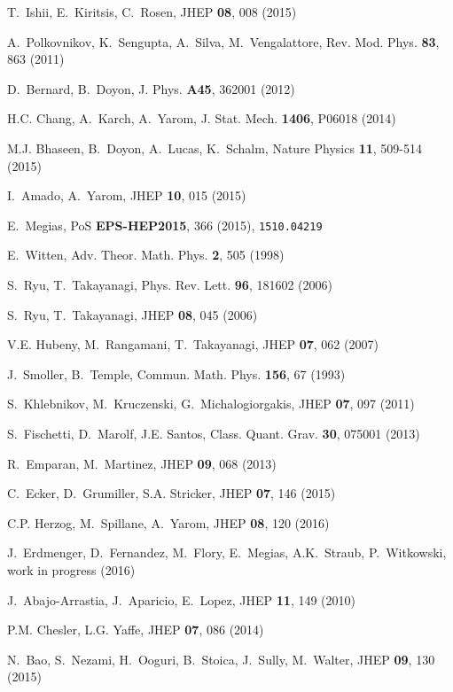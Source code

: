 \documentclass[epj]{webofc}
\begin{document}
\begin{thebibliography}{99}


T.~Ishii, E.~Kiritsis, C.~Rosen, JHEP \textbf{08}, 008 (2015)

A.~Polkovnikov, K.~Sengupta, A.~Silva, M.~Vengalattore, Rev. Mod. Phys. \textbf{83}, 863 (2011)

D.~Bernard, B.~Doyon, J. Phys. \textbf{A45}, 362001 (2012)

H.C. Chang, A.~Karch, A.~Yarom, J. Stat. Mech. \textbf{1406}, P06018 (2014)

M.J. Bhaseen, B.~Doyon, A.~Lucas, K.~Schalm, Nature Physics \textbf{11}, 509-514 (2015)

I.~Amado, A.~Yarom, JHEP \textbf{10}, 015 (2015)

E.~Megias, PoS \textbf{EPS-HEP2015}, 366 (2015), \texttt{1510.04219}

E.~Witten, Adv. Theor. Math. Phys. \textbf{2}, 505 (1998)

S.~Ryu, T.~Takayanagi, Phys. Rev. Lett. \textbf{96}, 181602 (2006)

S.~Ryu, T.~Takayanagi, JHEP \textbf{08}, 045 (2006)

V.E. Hubeny, M.~Rangamani, T.~Takayanagi, JHEP \textbf{07}, 062 (2007)

J.~Smoller, B.~Temple, Commun. Math. Phys. \textbf{156}, 67 (1993)

S.~Khlebnikov, M.~Kruczenski, G.~Michalogiorgakis, JHEP \textbf{07}, 097 (2011)

S.~Fischetti, D.~Marolf, J.E. Santos, Class. Quant. Grav. \textbf{30}, 075001 (2013)

R.~Emparan, M.~Martinez, JHEP \textbf{09}, 068 (2013)

C.~Ecker, D.~Grumiller, S.A. Stricker, JHEP \textbf{07}, 146 (2015)

C.P. Herzog, M.~Spillane, A.~Yarom, JHEP \textbf{08}, 120 (2016)

J.~Erdmenger, D.~Fernandez, M.~Flory, E.~Megias, A.K.~Straub, P.~Witkowski, work in progress (2016)

J.~Abajo-Arrastia, J.~Aparicio, E.~Lopez, JHEP \textbf{11}, 149 (2010)

P.M. Chesler, L.G. Yaffe, JHEP \textbf{07}, 086 (2014)

N.~Bao, S.~Nezami, H.~Ooguri, B.~Stoica, J.~Sully, M.~Walter, JHEP \textbf{09}, 130 (2015)



\end{thebibliography}

%
\end{document}
